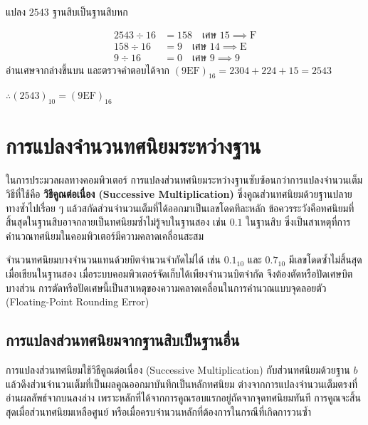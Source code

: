 \begin{ex}
\label{ex:dec-to-hex-2543}
แปลง $2543$ ฐานสิบเป็นฐานสิบหก
\end{ex}
\begin{solution}
\begin{align*}
2543 \div 16 &= 158 \quad \text{เศษ } 15 \implies \mathrm{F}\\
 158 \div 16 &= 9   \quad \text{เศษ } 14 \implies \mathrm{E}\\
   9 \div 16 &= 0   \quad \text{เศษ } 9  \implies 9
\end{align*}
อ่านเศษจากล่างขึ้นบน และตรวจคำตอบได้จาก $(9\mathrm{EF})_{16} = 2304 + 224 + 15 = 2543$

$\therefore (2543)_{10} = (9\mathrm{EF})_{16}$ \solhere
\end{solution}

\section{การแปลงจำนวนทศนิยมระหว่างฐาน}
\label{sec:fractional-base-conversion}

ในการประมวลผลทางคอมพิวเตอร์ การแปลงส่วนทศนิยมระหว่างฐานซับซ้อนกว่าการแปลงจำนวนเต็ม วิธีที่ใช้คือ \textbf{วิธีคูณต่อเนื่อง (Successive Multiplication)} ซึ่งคูณส่วนทศนิยมด้วยฐานปลายทางซ้ำไปเรื่อย ๆ แล้วสกัดส่วนจำนวนเต็มที่ได้ออกมาเป็นเลขโดดทีละหลัก ข้อควรระวังคือทศนิยมที่สิ้นสุดในฐานสิบอาจกลายเป็นทศนิยมซ้ำไม่รู้จบในฐานสอง เช่น $0.1$ ในฐานสิบ ซึ่งเป็นสาเหตุที่การคำนวณทศนิยมในคอมพิวเตอร์มีความคลาดเคลื่อนสะสม~\parencite{wakerly2018digital}

จำนวนทศนิยมบางจำนวนแทนด้วยบิตจำนวนจำกัดไม่ได้ เช่น $0.1_{10}$ และ $0.7_{10}$ มีเลขโดดซ้ำไม่สิ้นสุดเมื่อเขียนในฐานสอง เมื่อระบบคอมพิวเตอร์จัดเก็บได้เพียงจำนวนบิตจำกัด จึงต้องตัดหรือปัดเศษบิตบางส่วน การตัดหรือปัดเศษนี้เป็นสาเหตุของความคลาดเคลื่อนในการคำนวณแบบจุดลอยตัว (Floating-Point Rounding Error)

\subsection{การแปลงส่วนทศนิยมจากฐานสิบเป็นฐานอื่น}
\label{ssec:fractional-conversion}
การแปลงส่วนทศนิยมใช้วิธีคูณต่อเนื่อง (Successive Multiplication) กับส่วนทศนิยมด้วยฐาน $b$ แล้วดึงส่วนจำนวนเต็มที่เป็นผลคูณออกมาบันทึกเป็นหลักทศนิยม ต่างจากการแปลงจำนวนเต็มตรงที่อ่านผลลัพธ์จากบนลงล่าง เพราะหลักที่ได้จากการคูณรอบแรกอยู่ถัดจากจุดทศนิยมทันที การคูณจะสิ้นสุดเมื่อส่วนทศนิยมเหลือศูนย์ หรือเมื่อครบจำนวนหลักที่ต้องการในกรณีที่เกิดการวนซ้ำ~\parencite{tremblay1975structures}

